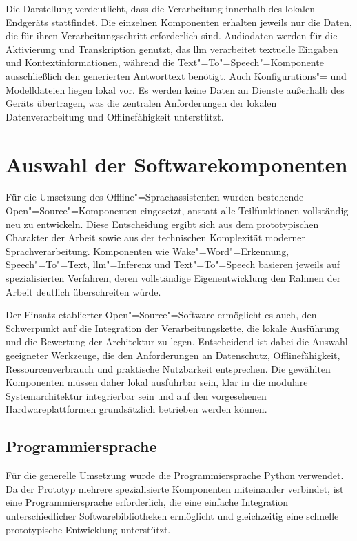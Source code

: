 Die Darstellung verdeutlicht, dass die Verarbeitung innerhalb des lokalen Endgeräts stattfindet. Die einzelnen Komponenten erhalten jeweils nur die Daten, die für ihren Verarbeitungsschritt erforderlich sind. Audiodaten werden für die Aktivierung und Transkription genutzt, das \gls{llm} verarbeitet textuelle Eingaben und Kontextinformationen, während die Text"=To"=Speech"=Komponente ausschließlich den generierten Antworttext benötigt. Auch Konfigurations"= und Modelldateien liegen lokal vor. Es werden keine Daten an Dienste außerhalb des Geräts übertragen, was die zentralen Anforderungen der lokalen Datenverarbeitung und Offlinefähigkeit unterstützt.


\section{Auswahl der Softwarekomponenten}
\label{sec:Auswahl_der_Softwarekomponenten}
Für die Umsetzung des Offline"=Sprachassistenten wurden bestehende Open"=Source"=Komponenten eingesetzt, anstatt alle Teilfunktionen vollständig neu zu entwickeln. Diese Entscheidung ergibt sich aus dem prototypischen Charakter der Arbeit sowie aus der technischen Komplexität moderner Sprachverarbeitung. Komponenten wie Wake"=Word"=Erkennung, Speech"=To"=Text, \gls{llm}"=Inferenz und Text"=To"=Speech basieren jeweils auf spezialisierten Verfahren, deren vollständige Eigenentwicklung den Rahmen der Arbeit deutlich überschreiten würde.

Der Einsatz etablierter Open"=Source"=Software ermöglicht es auch, den Schwerpunkt auf die Integration der Verarbeitungskette, die lokale Ausführung und die Bewertung der Architektur zu legen. Entscheidend ist dabei die Auswahl geeigneter Werkzeuge, die den Anforderungen an Datenschutz, Offlinefähigkeit, Ressourcenverbrauch und praktische Nutzbarkeit entsprechen. Die gewählten Komponenten müssen daher lokal ausführbar sein, klar in die modulare Systemarchitektur integrierbar sein und auf den vorgesehenen Hardwareplattformen grundsätzlich betrieben werden können.


\subsection{Programmiersprache}
\label{subsec:Programmiersprache}
Für die generelle Umsetzung wurde die Programmiersprache Python \autocite{Python314-Documentation} verwendet. Da der Prototyp mehrere spezialisierte Komponenten miteinander verbindet, ist eine Programmiersprache erforderlich, die eine einfache Integration unterschiedlicher Softwarebibliotheken ermöglicht und gleichzeitig eine schnelle prototypische Entwicklung unterstützt.

